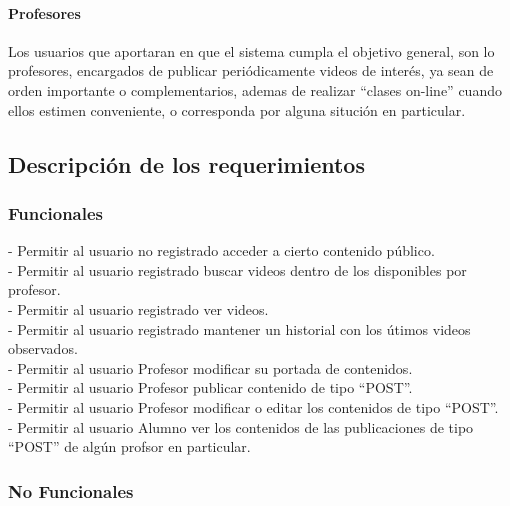 \documentclass[12pt]{article}
\begin{document}
\paragraph{Profesores\\}

Los usuarios que aportaran en que el sistema cumpla el objetivo general, son lo profesores, 
encargados de publicar periódicamente videos de interés, ya sean de orden importante o complementarios, 
ademas de realizar ``clases on-line'' cuando ellos estimen conveniente, o corresponda por alguna situción
en particular.
\subsection{Descripción de los requerimientos}
\subsubsection{Funcionales}

- Permitir al usuario no registrado acceder a cierto contenido público.\\


- Permitir al usuario registrado buscar videos dentro de los disponibles por profesor.\\

- Permitir al usuario registrado ver videos.\\

- Permitir al usuario registrado mantener un historial con los útimos videos observados.\\ 

- Permitir al usuario Profesor modificar su portada de contenidos.\\

- Permitir al usuario Profesor publicar contenido de tipo ``POST''.\\

- Permitir al usuario Profesor modificar o editar los contenidos de tipo ``POST''.\\

- Permitir al usuario Alumno ver los contenidos de las publicaciones de tipo ``POST'' de algún profsor en 
particular.\\

\newpage
\subsubsection{No Funcionales}
\end{document}
